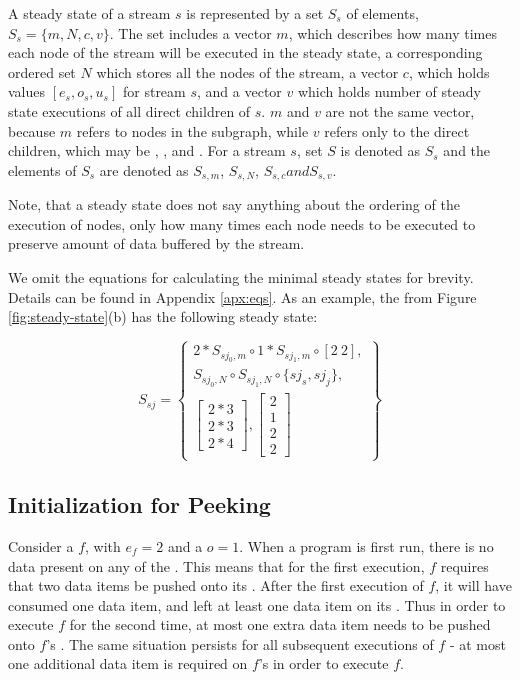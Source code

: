 A steady state of a stream $s$ is represented by a set $S_s$ of
elements, $S_s = \{m, N, c, v\}$. The set includes a vector $m$,
which describes how many times each {\StreamIt} node of the stream
will be executed in the steady state, a corresponding ordered set
$N$ which stores all the nodes of the stream, a vector $c$, which
holds values $[e_s, o_s, u_s]$ for stream $s$, and a vector $v$
which holds number of steady state executions of all direct
children of $s$. $m$ and $v$ are not the same vector, because $m$
refers to nodes in the subgraph, while $v$ refers only to the
direct children, which may be {\filters}, {\pipelines},
{\splitters} and {{\feedbackloops}}. For a stream $s$, set $S$ is
denoted as $S_s$ and the elements of $S_s$ are denoted as
$S_{s,m}$, $S_{s,N}$, $S_{s,c} and S_{s,v}$.

Note, that a steady state does not say anything about the ordering
of the execution of nodes, only how many times each node needs to
be executed to preserve amount of data buffered by the stream.

We omit the equations for calculating the minimal steady states
for brevity. Details can be found in Appendix \ref{apx:eqs}. As an
example, the {\splitjoin} from Figure \ref{fig:steady-state}(b) has
the following steady state:

\begin{displaymath}
S_{sj} = \left\{
\begin{array}{c}
2 * S_{sj_0, m} \circ 1 * S_{sj_1, m} \circ [2\ 2], \\
S_{sj_0, N} \circ S_{sj_1, N} \circ \{sj_s, sj_j\}, \\
\left[
\begin{array}{c}
2 * 3 \\ 2 * 3 \\ 2 * 4
\end{array}
\right], \left[
\begin{array}{c}
2 \\ 1 \\ 2 \\ 2
\end{array}\right]
\end{array} \right\}
\end{displaymath}

\subsection{Initialization for Peeking}
\label{sec:init-peeking}

Consider a {\filter} $f$, with $e_f = 2$ and a $o = 1$. When a
{\StreamIt} program is first run, there is no data present on any
of the {{\Channels}}.  This means that for the first execution,
\filter $f$ requires that two data items be pushed onto its
{\Input} {{\Channel}}.  After the first execution of $f$, it will
have consumed one data item, and left at least one data item on
its {\Input} {{\Channel}}.  Thus in order to execute $f$ for the
second time, at most one extra data item needs to be pushed onto
$f$'s {\Input} {{\Channel}}.  The same situation persists for all
subsequent executions of $f$ - at most one additional data item is
required on $f$'s {\Input} {{\Channel}} in order to execute $f$.

